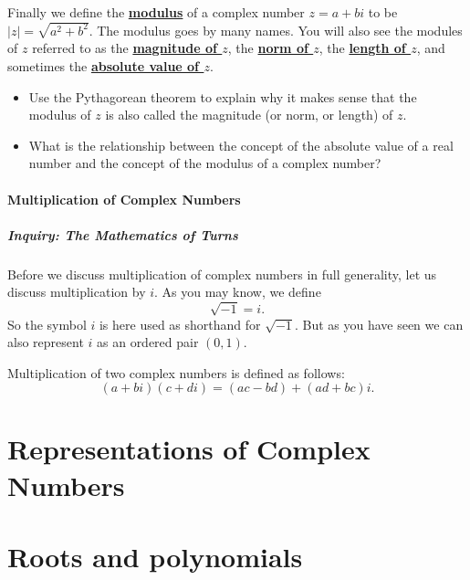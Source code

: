 \documentclass[11pt]{article}
\newenvironment{task}
	{\begin{mdframed}[linecolor=lightgray, linewidth=3pt]\raggedright}
	{\end{mdframed}}
\renewcommand\emph[1]{\underline{\bf{#1}}} %
\theoremstyle{definition}
\begin{document}
Finally we define the \emph{modulus} of a complex number $z=a+bi$ to be $|z| = \sqrt{a^2+b^2}$. The modulus goes by many names. You will also see the modules of $z$
referred to as the \emph{magnitude of $z$}, the \emph{norm of $z$}, the \emph{length of $z$}, and sometimes the \emph{absolute value of $z$}.

\begin{task}
  \begin{itemize}
    \item Use the Pythagorean theorem to explain why it makes sense that the modulus of $z$ is also called the magnitude (or norm, or length) of $z$.
    \item What is the relationship between the concept of the absolute value of a real number and the concept of the modulus of a complex number?
  \end{itemize}
\end{task}

\subsection{Multiplication of Complex Numbers}

\subsubsection{Inquiry: The Mathematics of Turns}

Before we discuss multiplication of complex numbers in full generality, let us discuss multiplication by $i$. As you may know, we define
\[ \sqrt{-1} = i. \]
So the symbol $i$ is here used as shorthand for $\sqrt{-1}$. But as you have seen we can also represent $i$ as an ordered pair $(0,1)$.

Multiplication of two complex numbers is defined as follows:
\[ (a+bi)(c+di) = (ac-bd) + (ad+bc)i.\]

\part{Representations of Complex Numbers}

\part{Roots and polynomials}
\end{document}
